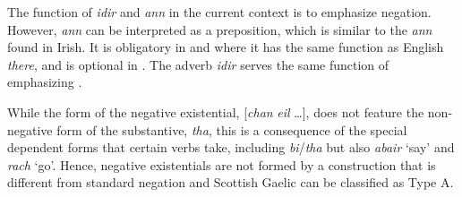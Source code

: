 \documentclass[output=paper]{langsci/langscibook}
\begin{document}
\begin{unindented}
The function of \textit{idir} and \textit{ann} in the current context is to emphasize negation. However, \textit{ann} can be interpreted as a preposition, which is similar to the \textit{ann} found in Irish. It is obligatory in  and  where it has the same function as English \textit{there}, and is optional in . The adverb \textit{idir} serves the same function of emphasizing .  

While the form of the negative existential, [\textit{chan} \textit{eil} …],
does not feature the non-negative form of the substantive, \textit{tha},
this is a consequence of the special dependent forms that certain verbs
take, including \textit{bi}/\textit{tha} but also \textit{abair} `say' and \textit{rach} ‘go'. Hence, negative existentials are not formed by a construction that is different from standard negation and Scottish Gaelic can be classified as Type A. 

\end{unindented}
\newpage
\end{document}
